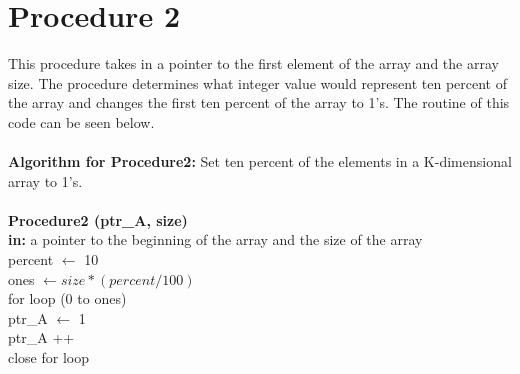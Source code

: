 \documentclass[10pt,a4paper]{article}
\begin{document}
\section{Procedure 2}
This procedure takes in a pointer to the first element of the array and the array size. The procedure determines what integer value would represent ten percent of the array and changes the first ten percent of the array to 1's. The routine of this code can be seen below. \\ \\
\textbf{Algorithm for Procedure2:} Set ten percent of the elements in a K-dimensional array to 1's.\\ \\
\textbf{Procedure2 (ptr\_A, size)} \\
\indent \textbf{in:} a pointer to the beginning of the array and the size of the array\\
\indent percent $\leftarrow$ 10\\
\indent ones $\leftarrow$$size * (percent / 100)$ \\
\indent for loop (0 to ones) \\
\indent \indent ptr\_A  $\leftarrow$ 1 \\
\indent\indent ptr\_A ++ \\
\indent close for loop
\end{document}
